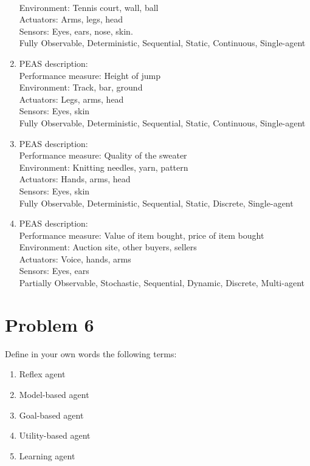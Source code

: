 \documentclass{article}
\begin{document}
\begin{enumerate}[label= (\alph*)]
    \\Environment: Tennis court, wall, ball
    \\Actuators: Arms, legs, head
    \\Sensors: Eyes, ears, nose, skin.
    \\Fully Observable, Deterministic, Sequential, Static, Continuous, Single-agent
    \item PEAS description: 
    \\Performance measure: Height of jump 
    \\Environment: Track, bar, ground
    \\Actuators: Legs, arms, head
    \\Sensors: Eyes, skin
    \\Fully Observable, Deterministic, Sequential, Static, Continuous, Single-agent
    \item PEAS description: 
    \\Performance measure: Quality of the sweater \\Environment: Knitting needles, yarn, pattern 
    \\Actuators: Hands, arms, head
    \\Sensors: Eyes, skin
    \\Fully Observable, Deterministic, Sequential, Static, Discrete, Single-agent
    \item PEAS description: 
    \\Performance measure: Value of item bought, price of item bought 
    \\Environment: Auction site, other buyers, sellers 
    \\Actuators: Voice, hands, arms
    \\Sensors: Eyes, ears
    \\Partially Observable, Stochastic, Sequential, Dynamic, Discrete, Multi-agent
\end{enumerate}

\section*{Problem 6}
Define in your own words the following terms:

\begin{enumerate}[label= (\alph*)]
    \item Reflex agent
    \item Model-based agent
    \item Goal-based agent
    \item Utility-based agent
    \item Learning agent
\end{enumerate}
\end{document}
